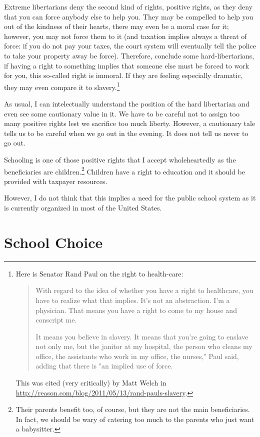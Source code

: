 Extreme libertarians deny the second kind of rights, positive rights, as they
deny that you can force anybody else to help you. They may be compelled to help
you out of the kindness of their hearts, there may even be a moral case for it;
however, you may not force them to it (and taxation implies always a threat of
force: if you do not pay your taxes, the court system will eventually tell the
police to take your property away be force). Therefore, conclude some
hard-libertarians, if having a right to something implies that someone else
must be forced to work for you, this so-called right is immoral. If they are
feeling especially dramatic, they may even compare it to slavery.\footnote{Here
is Senator Rand Paul on the right to health-care:

\begin{quote}
With regard to the idea of whether you have a right to healthcare, you have to
realize what that implies. It's not an abstraction. I'm a physician. That means
you have a right to come to my house and conscript me.

It means you believe in slavery. It means that you're going to enslave not only
me, but the janitor at my hospital, the person who cleans my office, the
assistants who work in my office, the nurses," Paul said, adding that there is
"an implied use of force.
\end{quote}

This was cited (very critically) by Matt Welch in
\href{Reason}{http://reason.com/blog/2011/05/13/rand-pauls-slavery}.}

As usual, I can intelectually understand the position of the hard libertarian
and even see some cautionary value in it. We have to be careful not to assign
too many positive rights lest we sacrifice too much liberty. However, a
cautionary tale tells us to be careful when we go out in the evening. It does
not tell us never to go out.

Schooling is one of those positive rights that I accept wholeheartedly as the
beneficiaries are children.\footnote{Their parents benefit too, of course, but
they are not the main beneficiaries. In fact, we should be wary of catering too
much to the parents who just want a babysitter.} Children have a right to
education and it should be provided with taxpayer resources.

However, I do not think that this implies a need for the public school system
as it is currently organized in most of the United States.

\section{School Choice}

